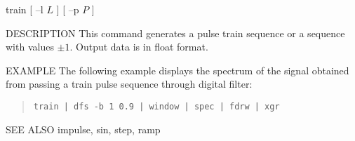 
\begin{synopsis}
\item[train] [ --l $L$ ] [ --p $P$ ]
\end{synopsis}

\begin{qsection}{DESCRIPTION}
This command generates a pulse train sequence or a sequence with
values $\pm 1$.
Output data is in float format.
\end{qsection}

\begin{options}
\end{options}

\begin{qsection}{EXAMPLE}
The following example displays the spectrum of
the signal obtained from passing a train pulse sequence through
digital filter:
\begin{quote}
\verb!train | dfs -b 1 0.9 | window | spec | fdrw | xgr!
\end{quote}
\end{qsection}

\begin{qsection}{SEE ALSO}
  impulse, sin, step, ramp
\end{qsection}


